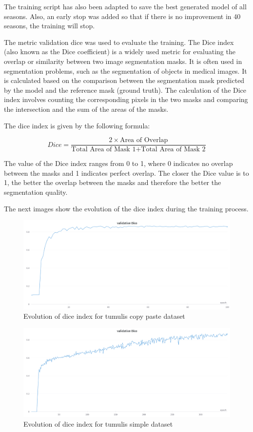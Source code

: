 The training script has also been adapted to save the best generated model of all seasons. Also, an early stop was added so that if there is no improvement in 40 seasons, the training will stop.

The metric validation dice was used to evaluate the training. The Dice index (also known as the Dice coefficient) is a widely used metric for evaluating the overlap or similarity between two image segmentation masks. It is often used in segmentation problems, such as the segmentation of objects in medical images. It is calculated based on the comparison between the segmentation mask predicted by the model and the reference mask (ground truth). The calculation of the Dice index involves counting the corresponding pixels in the two masks and comparing the intersection and the sum of the areas of the masks.

The dice index is given by the following formula:

\begin{equation}
    Dice = \frac{2 \times \text{Area of Overlap}}{\text{Total Area of Mask 1} + \text{Total Area of Mask 2}}
\end{equation}

The value of the Dice index ranges from 0 to 1, where 0 indicates no overlap between the masks and 1 indicates perfect overlap. The closer the Dice value is to 1, the better the overlap between the masks and therefore the better the segmentation quality.

The next images show the evolution of the dice index during the training process.

\begin{figure}[H]
\centering
\includegraphics[width=12cm]{images/unet/mamoas_copy.png}
\caption{Evolution of dice index for tumulis copy paste dataset}
\end{figure}

\begin{figure}[H]
\centering
\includegraphics[width=12cm]{images/unet/mamoas_simple.png}
\caption{Evolution of dice index for tumulis simple dataset}
\end{figure}

